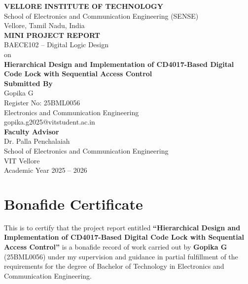 \documentclass[12pt,a4paper]{report}
\begin{document}
\thispagestyle{empty}
\begin{center}
{\Large \textbf{VELLORE INSTITUTE OF TECHNOLOGY}} \\[0.2cm]
{\large School of Electronics and Communication Engineering (SENSE)} \\
{\large Vellore, Tamil Nadu, India} \\[1cm]

{\Large \textbf{MINI PROJECT REPORT}} \\[0.3cm]
{\large BAECE102 -- Digital Logic Design} \\[0.3cm]
{\large on} \\[0.3cm]
{\Large \textbf{Hierarchical Design and Implementation of CD4017-Based Digital Code Lock with Sequential Access Control}} \\[1.5cm]

{\large \textbf{Submitted By}} \\[0.2cm]
{\large Gopika G} \\
{\large Register No: 25BML0056} \\
{\large Electronics and Communication Engineering} \\
{\large gopika.g2025@vitstudent.ac.in} \\[1cm]

{\large \textbf{Faculty Advisor}} \\[0.2cm]
{\large Dr. Palla Penchalaiah} \\
{\large School of Electronics and Communication Engineering} \\
{\large VIT Vellore} \\[1cm]

{\large Academic Year 2025 -- 2026}
\end{center}

\clearpage
\chapter*{Bonafide Certificate}

This is to certify that the project report entitled \textbf{``Hierarchical Design and Implementation of CD4017-Based Digital Code Lock with Sequential Access Control''} is a bonafide record of work carried out by \textbf{Gopika G} (25BML0056) under my supervision and guidance in partial fulfillment of the requirements for the degree of Bachelor of Technology in Electronics and Communication Engineering.
\end{document}
